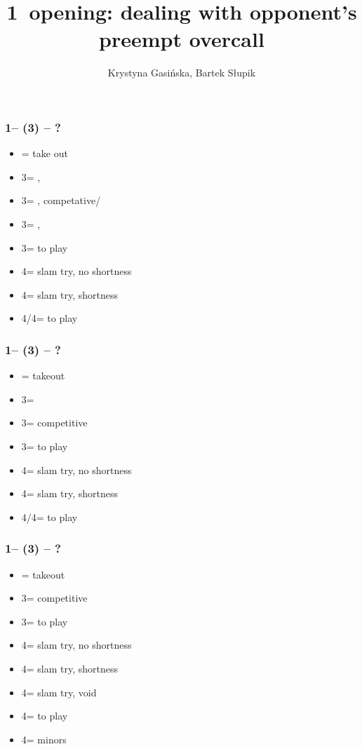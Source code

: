 \documentclass[12pt, a4paper]{article}
\title{1\spades\ opening: dealing with opponent's preempt overcall}
\author{Krystyna Gasińska, Bartek Słupik}
\begin{document}
\maketitle


\subsubsection*{1\spades -- (3\clubs) -- ?}
\begin{itemize}
    \item \dbl = take out
    \item 3\diams = \hearts, \invp
    \item 3\hearts = \spades, competative/\gf
    \item 3\spades = \spades, \inv
    \item 3\nt = to play
    \item 4\clubs = slam try, no \clubs shortness
    \item 4\diams = slam try, \clubs shortness
    \item 4\hearts/4\spades = to play
\end{itemize}

\subsubsection*{1\spades -- (3\diams) -- ?}
\begin{itemize}
    \item \dbl = takeout
    \item 3\hearts = \hearts\ \gf
    \item 3\spades = competitive
    \item 3\nt = to play
    \item 4\clubs = slam try, no \diams shortness
    \item 4\diams = slam try, \diams shortness
    \item 4\hearts/4\spades = to play
\end{itemize}

\subsubsection*{1\spades -- (3\hearts) -- ?}
\begin{itemize}
    \item \dbl = takeout
    \item 3\spades = competitive
    \item 3\nt = to play
    \item 4\clubs = slam try, no \diams shortness
    \item 4\diams = slam try, \diams shortness
    \item 4\hearts = slam try, \hearts void
    \item 4\spades = to play
    \item 4\nt = minors
\end{itemize}

\end{document}
